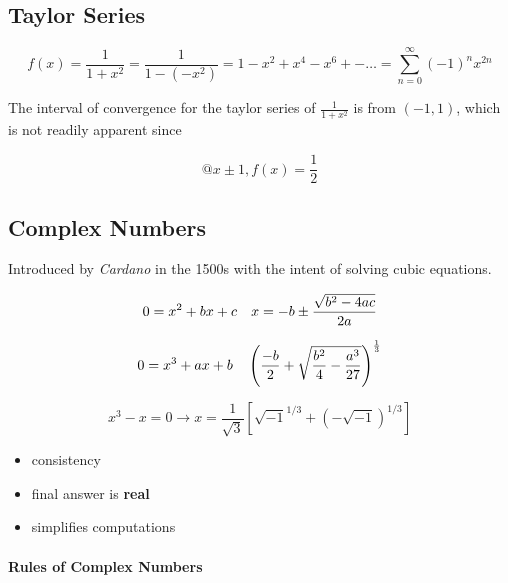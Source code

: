 \documentclass[svgnames]{article}   	%
\begin{document}
\subsection{Taylor Series}

\[
f(x) = \frac{1}{1+x^2} = \frac{1}{1-(-x^2)} = 1 - x^2 + x^4 - x^6 + - \dots
= \sum_{n=0}^{\infty} (-1)^n x^{2n}
\]

The interval of convergence for the taylor series of $\frac{1}{1+x^2}$ is from
$(-1,1)$, which is not readily apparent since 

 \[
@x \pm 1, f(x) = \frac{1}{2}
\]


\subsection{Complex Numbers}

Introduced by \textit{Cardano} in the 1500s with the intent of solving cubic
equations.

\begin{tcolorbox}[colback = red!5!white, colframe = red!50!black, title
  = Quadratic Equations]
  
  \[
  0 = x^2 + bx + c \hspace{10px} x = -b \pm \frac{ \sqrt{b^2 - 4ac}}{2a}
  \]
\end{tcolorbox}

\begin{tcolorbox}[colback = blue!5!white, colframe = blue!50!black, title
  = Cubic Equations]
  \[
  0 = x^3 + ax + b \hspace{10px} \left(\frac{-b}{2} + \sqrt{\frac{b^2}{4}
  - \frac{a^3}{27}}\right)^{\frac{1}{3}}
  \]

  \[
    x^3 - x = 0 \rightarrow x = \frac{1}{ \sqrt{3}}\left[\sqrt{-1}^{1/3}
    + (-\sqrt{-1})^{1/3} \right]
  \]
  \begin{itemize}
    \item consistency
    \item final answer is \textbf{real}
    \item simplifies computations
  \end{itemize}  
  
\end{tcolorbox}

\paragraph{Rules of Complex Numbers}
\end{document}
